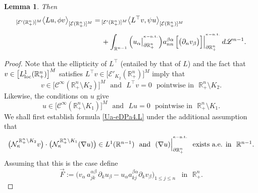 \documentclass[11pt,reqno]{amsart}
\numberwithin{equation}{section}
\newtheorem{lemma}[theorem]{Lemma}
\theoremstyle{remark}
\begin{document}
\begin{lemma}
Then
%
\begin{align}\label{Ua-eDPa4.L}
{}_{[{\mathcal{E}}'(\mathbb{R}^{n}_{+})]^M}\big\langle Lu,\phi v
\big\rangle_{[{\mathcal{E}}(\mathbb{R}^{n}_{+})]^M}
=&\,
{}_{[{\mathcal{E}}'(\mathbb{R}^{n}_{+})]^M}\big\langle L^{\top}v,
\psi u\big\rangle_{[{\mathcal{E}}(\mathbb{R}^{n}_{+})]^M}
\nonumber\\[4pt]
&\,+\int_{\mathbb{R}^{n-1}}
\Big(u_\alpha\big|_{\partial\mathbb{R}^{n}_{+}}^{{}^{\kappa-{\rm n.t.}}}\Big) 
a^{\beta\alpha}_{nn}\,\Big[\big(\partial_n v_\beta\big)\Big]
\Big|_{\partial\mathbb{R}^{n}_{+}}^{{}^{\kappa-{\rm n.t.}}}\,d{\mathscr{L}}^{n-1}.
\end{align}
\end{lemma}

\begin{proof}
Note that the ellipticity of $L^{\top}$ (entailed by that of $L$) and the 
fact that $v\in\big[L^1_{\rm loc}({\mathbb{R}}^n_{+})\big]^M$ satisfies
$L^{\top}v\in\big[{\mathcal{E}}'_{K_2}(\mathbb{R}^{n}_{+})\big]^M$ imply that 
%
\begin{equation}\label{Di-UPs-4}
v\in\big[{\mathscr{C}}^\infty(\mathbb{R}^{n}_{+}\setminus K_2)\big]^M\,\,\text{ and }\,\,
L^{\top}v=0\,\,\text{ pointwise in }\,\,\mathbb{R}^{n}_{+}\setminus K_2.
\end{equation}
%
Likewise, the conditions on $u$ give  
%
\begin{equation}\label{Di-UabTRF.a}
u\in\big[{\mathscr{C}}^\infty(\mathbb{R}^{n}_{+}\setminus K_1)\big]^M\,\,\text{ and }\,\,
Lu=0\,\,\text{ pointwise in }\,\,\mathbb{R}^{n}_{+}\setminus K_1.
\end{equation}
%
We shall first establish formula \eqref{Ua-eDPa4.L} under the additional assumption that 
%
\begin{equation}\label{Di-UabTRF.b}
\begin{array}{c}
\big({\mathcal{N}}_\kappa^{\,\mathbb{R}^{n}_{+}\setminus K_2}v\big)\cdot
\big({\mathcal{N}}^{\,\mathbb{R}^{n}_{+}\setminus K_1}_\kappa(\nabla u)\big)\in L^1({\mathbb{R}}^{n-1})
\,\,\text{ and }\,\,(\nabla u)\Big|_{\partial\mathbb{R}^{n}_{+}}^{{}^{\kappa-{\rm n.t.}}}\,\,
\text{ exists a.e. in }\,\,{\mathbb{R}}^{n-1}.
\end{array}
\end{equation}
%
Assuming that this is the case define 
%
\begin{equation}\label{Yab-HBBaR46}
\vec{F}:=\Big(v_{\alpha}\,a^{\alpha\beta}_{jk}\,\partial_k u_\beta
-u_\alpha a^{\beta\alpha}_{kj}\partial_k v_{\beta}\Big)_{1\le j\le n}
\,\,\,\text{ in }\,\,{\mathbb{R}}^n_{+}.

\end{equation}
\end{proof}
\end{document}
